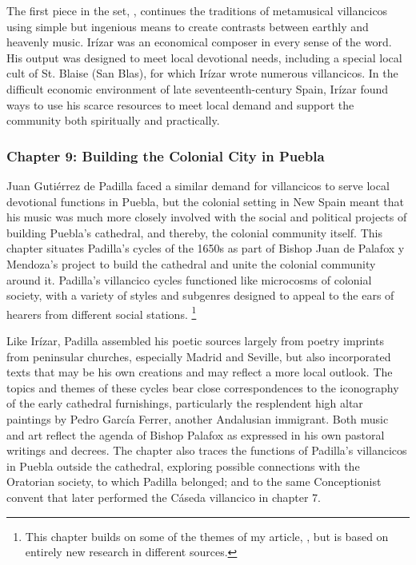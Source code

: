 \documentclass{vcbook-proposal}
\begin{document}
The first piece in the set, , continues the traditions of metamusical villancicos using simple but ingenious means to create contrasts between earthly and heavenly music.
Irízar was an economical composer in every sense of the word.
His output was designed to meet local devotional needs, including a special local cult of St. Blaise (San Blas), for which Irízar wrote numerous villancicos. 
In the difficult economic environment of late seventeenth-century Spain, Irízar found ways to use his scarce resources to meet local demand and support the community both spiritually and practically.

\subsubsection{Chapter 9: Building the Colonial City in Puebla}

Juan Gutiérrez de Padilla faced a similar demand for villancicos to serve local devotional functions in Puebla, but the colonial setting in New Spain meant that his music was much more closely involved with the social and political projects of building Puebla's cathedral, and thereby, the colonial community itself.
This chapter situates Padilla's cycles of the 1650s as part of Bishop Juan de Palafox y Mendoza's project to build the cathedral and unite the colonial community around it.
Padilla's villancico cycles functioned like microcosms of colonial society, with a variety of styles and subgenres designed to appeal to the ears of hearers from different social stations.%
  \footnote{This chapter builds on some of the themes of my article, \autocite{Cashner:Cards}, but is based on entirely new research in different sources.}

Like Irízar, Padilla assembled his poetic sources largely from poetry imprints from peninsular churches, especially Madrid and Seville, but also incorporated texts that may be his own creations and may reflect a more local outlook.
The topics and themes of these cycles bear close correspondences to the iconography of the early cathedral furnishings, particularly the resplendent high altar paintings by Pedro García Ferrer, another Andalusian immigrant.
Both  music and art reflect the agenda of Bishop Palafox as expressed in his own pastoral writings and decrees.
The chapter also traces the functions of Padilla's villancicos in Puebla outside the cathedral, exploring possible connections with the Oratorian society, to which Padilla belonged; and to the same Conceptionist convent that later performed the Cáseda villancico in chapter 7.
\end{document}
